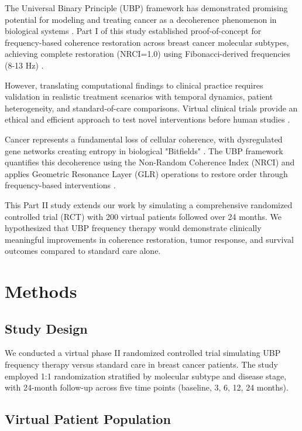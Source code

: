 \documentclass[12pt,a4paper]{article}
\begin{document}
The Universal Binary Principle (UBP) framework has demonstrated promising potential for modeling and treating cancer as a decoherence phenomenon in biological systems \cite{Craig2025Part1}. Part I of this study established proof-of-concept for frequency-based coherence restoration across breast cancer molecular subtypes, achieving complete restoration (NRCI=1.0) using Fibonacci-derived frequencies (8-13 Hz) \cite{Craig2025Part1}.

However, translating computational findings to clinical practice requires validation in realistic treatment scenarios with temporal dynamics, patient heterogeneity, and standard-of-care comparisons. Virtual clinical trials provide an ethical and efficient approach to test novel interventions before human studies \cite{Marshall2019}.

Cancer represents a fundamental loss of cellular coherence, with dysregulated gene networks creating entropy in biological "Bitfields" \cite{Levin2021}. The UBP framework quantifies this decoherence using the Non-Random Coherence Index (NRCI) and applies Geometric Resonance Layer (GLR) operations to restore order through frequency-based interventions \cite{Craig2025Part1}.

This Part II study extends our work by simulating a comprehensive randomized controlled trial (RCT) with 200 virtual patients followed over 24 months. We hypothesized that UBP frequency therapy would demonstrate clinically meaningful improvements in coherence restoration, tumor response, and survival outcomes compared to standard care alone.

\section{Methods}

\subsection{Study Design}

We conducted a virtual phase II randomized controlled trial simulating UBP frequency therapy versus standard care in breast cancer patients. The study employed 1:1 randomization stratified by molecular subtype and disease stage, with 24-month follow-up across five time points (baseline, 3, 6, 12, 24 months).

\subsection{Virtual Patient Population}
\end{document}
